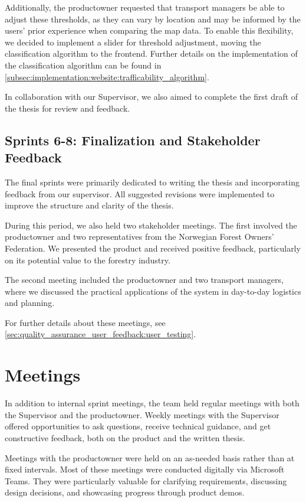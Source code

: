 Additionally, the \gls{productowner} requested that transport managers be able to adjust these thresholds, as they can vary by location and may be informed by the users' prior experience when comparing the map data. To enable this flexibility, we decided to implement a slider for threshold adjustment, moving the classification algorithm to the frontend. Further details on the implementation of the classification algorithm can be found in \autoref{subsec:implementation:website:trafficability_algorithm}.

In collaboration with our Supervisor, we also aimed to complete the first draft of the thesis for review and feedback.

\subsection*{Sprints 6-8: Finalization and Stakeholder Feedback}

The final sprints were primarily dedicated to writing the thesis and incorporating feedback from our supervisor. All suggested revisions were implemented to improve the structure and clarity of the thesis.

During this period, we also held two stakeholder meetings. The first involved the \gls{productowner} and two representatives from the Norwegian Forest Owners' Federation. We presented the product and received positive feedback, particularly on its potential value to the forestry industry.

The second meeting included the \gls{productowner} and two transport managers, where we discussed the practical applications of the system in day-to-day logistics and planning.

For further details about these meetings, see \autoref{sec:quality_assurance_user_feedback:user_testing}.

\section{Meetings}\label{sec:devpro:meetings}

In addition to internal sprint meetings, the team held regular meetings with both the Supervisor and the \gls{productowner}. Weekly meetings with the Supervisor offered opportunities to ask questions, receive technical guidance, and get constructive feedback, both on the product and the written thesis.

Meetings with the \gls{productowner} were held on an as-needed basis rather than at fixed intervals. Most of these meetings were conducted digitally via Microsoft Teams. They were particularly valuable for clarifying requirements, discussing design decisions, and showcasing progress through product demos.

